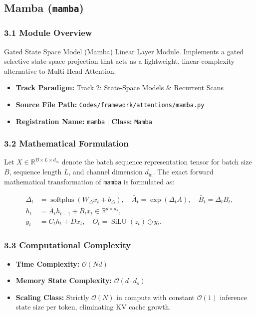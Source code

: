 \subsection{Mamba (\texttt{mamba})}
\label{sec:app_module_mamba}

\subsubsection*{3.1 Module Overview}
Gated State Space Model (Mamba) Linear Layer Module.  Implements a gated selective state-space projection that acts as a lightweight, linear-complexity alternative to Multi-Head Attention.
\begin{itemize}
    \item \textbf{Track Paradigm:} Track 2: State-Space Models \& Recurrent Scans
    \item \textbf{Source File Path:} \texttt{Codes/framework/attentions/mamba.py}
    \item \textbf{Registration Name:} \texttt{mamba} $\mid$ \textbf{Class:} \texttt{Mamba}
\end{itemize}

\subsubsection*{3.2 Mathematical Formulation}
Let $X \in \mathbb{R}^{B \times L \times d_{\text{in}}}$ denote the batch sequence representation tensor for batch size $B$, sequence length $L$, and channel dimension $d_{\text{in}}$. The exact forward mathematical transformation of \texttt{mamba} is formulated as:

\begin{align}
\Delta_t &= \operatorname{softplus}(W_\Delta x_t + b_\Delta), \quad \bar{A}_t = \exp(\Delta_t A), \quad \bar{B}_t = \Delta_t B_t, \\
h_t &= \bar{A}_t h_{t-1} + \bar{B}_t x_t \in \mathbb{R}^{d \times d_s}, \\
y_t &= C_t h_t + D x_t, \quad O_t = \operatorname{SiLU}(z_t) \odot y_t.
\end{align}


\subsubsection*{3.3 Computational Complexity}
\begin{itemize}
    \item \textbf{Time Complexity:} $\mathcal{O}(N d)$
    \item \textbf{Memory State Complexity:} $\mathcal{O}(d \cdot d_s)$
    \item \textbf{Scaling Class:} Strictly $\mathcal{O}(N)$ in compute with constant $\mathcal{O}(1)$ inference state size per token, eliminating KV cache growth.
\end{itemize}

